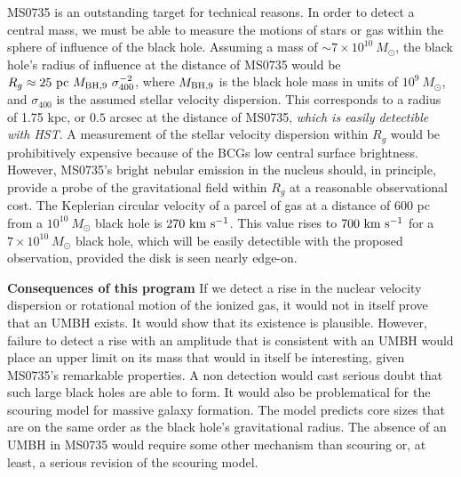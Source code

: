 \documentclass[12pt]{article}
\begin{document}
MS0735 is an outstanding target for technical reasons.  In order to detect a central mass, we must be able to measure the motions of stars or gas within the sphere of influence of the black hole.  Assuming a mass of $\sim 7\times 10^{10}~ M_\odot$, the
black hole's  radius of influence at the distance of MS0735 would be
$R_g\approx 25~{\rm pc}~M_{\rm BH,9}~\sigma_{400}^{-2}$, where $M_{\rm BH,9}$ is the black hole mass in units of $10^9~M_{\odot}$, and $ \sigma_{400}$ is the assumed stellar velocity dispersion.
 This corresponds to a radius of 1.75 kpc, or $0.5$ arcsec at the distance of MS0735, {\it which is easily detectible with HST}. 
A measurement of the stellar velocity dispersion within $R_g$ would be prohibitively expensive because of the BCGs low central surface brightness.  However, MS0735's bright nebular emission in the nucleus should, in principle, provide a probe of the gravitational field within $R_g$ at a reasonable observational cost. 
The Keplerian circular velocity of a parcel of gas at a distance of 600 pc from a $10^{10} ~ M_\odot$ black hole is $270 
~ \rm km~s^{-1}$.  This value rises
to $700 ~\rm km~s^{-1}$ for a $7\times 10^{10}~ M_\odot$ black hole, which will be easily detectible with the proposed observation,
provided the disk is seen nearly edge-on.

{\bf Consequences of this program} If we detect a rise in the nuclear velocity dispersion or rotational motion of the ionized gas, it would not in itself prove that an UMBH exists.
It would show that its existence is plausible.  However, failure to detect a 
rise with an amplitude that is consistent with an UMBH would place an upper limit on its mass that would in itself be interesting,
given MS0735's remarkable properties.  A non detection would cast serious doubt that such large black holes
are able to form.   It would also be problematical for the scouring model for massive galaxy formation.  The model predicts
core sizes that are on the same order as the black hole's gravitational radius.  The absence of an UMBH in MS0735 would require some other mechanism than scouring or, at least, a serious revision of the scouring model. 
\end{document}
